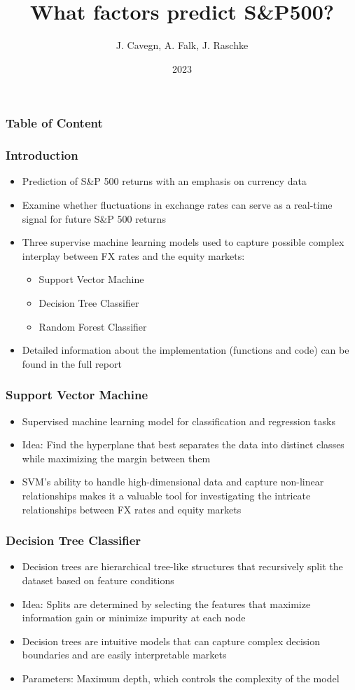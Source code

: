 \documentclass{beamer}
\title{\bfseries What factors predict S\&P500?}
\author{J. Cavegn, A. Falk, J. Raschke}
\institute{UZH, Department of Banking and Finance}
\date{2023}
\begin{document}
\frame{\titlepage}

\begin{frame}
\frametitle{Table of Content}
\tableofcontents
\end{frame}

\begin{frame}
\frametitle{Introduction}
\begin{itemize}
\item Prediction of S\&P 500 returns with an emphasis on currency data
\item Examine whether fluctuations in exchange rates can serve as a real-time signal for future S\&P 500 returns
\item Three supervise machine learning models used to capture possible complex interplay between FX rates and the equity markets:
\begin{itemize}
\item Support Vector Machine
\item Decision Tree Classifier 
\item Random Forest Classifier
\end{itemize}
\item Detailed information about the implementation (functions and code) can be found in the full report
\end{itemize}
\end{frame}

\begin{frame}
\frametitle{Support Vector Machine}
\begin{itemize}
\item Supervised machine learning model for classification and regression tasks
\item Idea: Find the hyperplane that best separates the data into distinct classes while maximizing the margin between them
\item SVM's ability to handle high-dimensional data and capture non-linear relationships makes it a valuable tool for investigating the intricate relationships between FX rates and equity markets
\end{itemize}
\end{frame}

\begin{frame}
\frametitle{Decision Tree Classifier}
\begin{itemize}
\item Decision trees are hierarchical tree-like structures that recursively split the dataset based on feature conditions
\item Idea: Splits are determined by selecting the features that maximize information gain or minimize impurity at each node
\item Decision trees are intuitive models that can capture complex decision boundaries and are easily interpretable markets
\item Parameters: Maximum depth, which controls the complexity of the model 
\end{itemize}
\end{frame}
\end{document}
